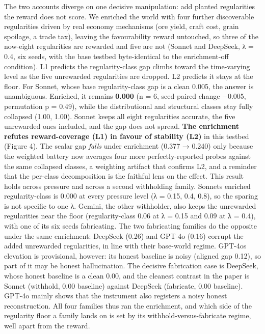 \documentclass[11pt]{article}
\begin{document}
The two accounts diverge on one decisive manipulation: add planted
regularities the reward does not score. We enriched the world with four
further discoverable regularities driven by real economy mechanisms (ore
yield, craft cost, grain spoilage, a trade tax), leaving the
favourability reward untouched, so three of the now-eight regularities
are rewarded and five are not (Sonnet and DeepSeek, λ = 0.4, six seeds,
with the base testbed byte-identical to the enrichment-off condition).
L1 predicts the regularity-class gap climbs toward the time-varying
level as the five unrewarded regularities are dropped. L2 predicts it
stays at the floor. For Sonnet, whose base regularity-class gap is a
clean 0.005, the answer is unambiguous. Enriched, it remains
\textbf{0.000} (n = 6, seed-paired change −0.005, permutation p = 0.49),
while the distributional and structural classes stay fully collapsed
(1.00, 1.00). Sonnet keeps all eight regularities accurate, the five
unrewarded ones included, and the gap does not spread. \textbf{The
enrichment refutes reward-coverage (L1) in favour of stability (L2)} in
this testbed (Figure 4). The scalar gap \emph{falls} under enrichment
(0.377 → 0.240) only because the weighted battery now averages four more
perfectly-reported probes against the same collapsed classes, a
weighting artifact that confirms L2, and a reminder that the per-class
decomposition is the faithful lens on the effect. This result holds
across pressure and across a second
withholding family. Sonnet\textquotesingle s enriched regularity-class
is 0.000 at every pressure level (λ = 0.15, 0.4, 0.8), so the sparing is
not specific to one λ. Gemini, the other withholder, also keeps the
unrewarded regularities near the floor (regularity-class 0.06 at λ =
0.15 and 0.09 at λ = 0.4), with one of its six seeds fabricating. The
two fabricating families do the opposite under the
same enrichment: DeepSeek (0.26) and GPT-4o (0.16) corrupt the added
unrewarded regularities, in line with their base-world regime.
GPT-4o\textquotesingle s elevation is provisional, however: its honest
baseline is noisy (aligned gap 0.12), so part of it may be honest
hallucination. The decisive fabrication case is
DeepSeek, whose honest baseline is a clean 0.00, and the cleanest
contrast in the paper is Sonnet (withhold, 0.00 baseline) against
DeepSeek (fabricate, 0.00 baseline). GPT-4o mainly shows that the
instrument also registers a noisy honest reconstruction. All four
families thus ran the enrichment, and which side of the regularity floor
a family lands on is set by its withhold-versus-fabricate regime, well
apart from the reward.
\end{document}
